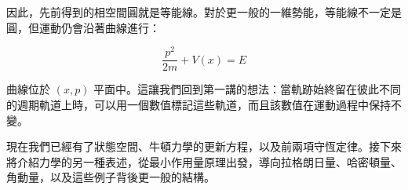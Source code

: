 因此，先前得到的相空間圓就是等能線。對於更一般的一維勢能，等能線不一定是圓，但運動仍會沿著曲線進行：

\begin{equation}
  \frac{p^2}{2m}+V(x)=E
  \label{eq:general-energy-contour}
\end{equation}

曲線位於 \((x,p)\) 平面中。這讓我們回到第一講的想法：當軌跡始終留在彼此不同的週期軌道上時，可以用一個數值標記這些軌道，而且該數值在運動過程中保持不變。

現在我們已經有了狀態空間、牛頓力學的更新方程，以及前兩項守恆定律。接下來將介紹力學的另一種表述，從最小作用量原理出發，導向拉格朗日量、哈密頓量、角動量，以及這些例子背後更一般的結構。

\begin{classroomqa}
\end{classroomqa}